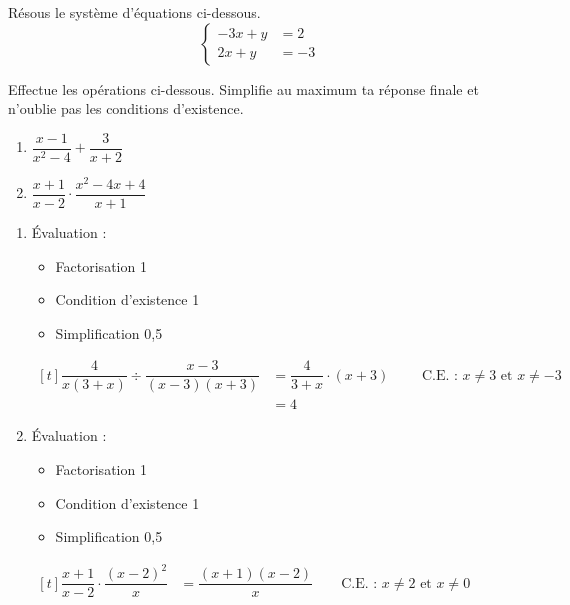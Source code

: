 \documentclass[a4paper, 12pt, parskip=half-, twoside=semi]{scrartcl}
\begin{document}
\begin{appliquer}[points=2]
    Résous le système d'équations ci-dessous.
    \[\left\{\begin{aligned}
            -3x+y & = 2 \\
            2x+y  & =-3
        \end{aligned}\right.\]
\end{appliquer}
\begin{solution}

\end{solution}

\begin{appliquer}[points=5]
    Effectue les opérations ci-dessous. Simplifie au maximum ta réponse finale et n'oublie pas les conditions d'existence.
    \begin{enumerate}[cols=2]
        \item %
              $\dfrac{x-1}{x^2-4} + \dfrac{3}{x+2}$
        \item %
              $\dfrac{x+1}{x-2}\cdot\dfrac{x^2-4x+4}{x+1}$
    \end{enumerate}
\end{appliquer}
\begin{solution}
    \begin{enumerate}
        \item
              Évaluation :
              \begin{itemize}
                  \item Factorisation \hfill 1
                  \item Condition d'existence \hfill 1
                  \item Simplification \hfill 0,5
              \end{itemize}
              $\begin{aligned}[t]
                      \dfrac{4}{x(3+x)}\div\dfrac{x-3}{(x-3)(x+3)} & = \dfrac{4}{3+x}\cdot (x+3)
                      \qquad\text{ C.E. : }x\ne 3\text{ et } x\ne -3                             \\
                                                                   & = 4
                  \end{aligned}$
        \item
              Évaluation :
              \begin{itemize}
                  \item Factorisation \hfill 1
                  \item Condition d'existence \hfill 1
                  \item Simplification \hfill 0,5
              \end{itemize}
              $\begin{aligned}[t]
                      \dfrac{x+1}{x-2} \cdot \dfrac{(x-2)^2}{x}
                       & = \dfrac{(x+1)(x-2)}{x}\qquad\text{C.E. : }x\ne 2 \text{ et } x \ne 0 \\
                  \end{aligned}$
    \end{enumerate}
\end{solution}
\end{document}
